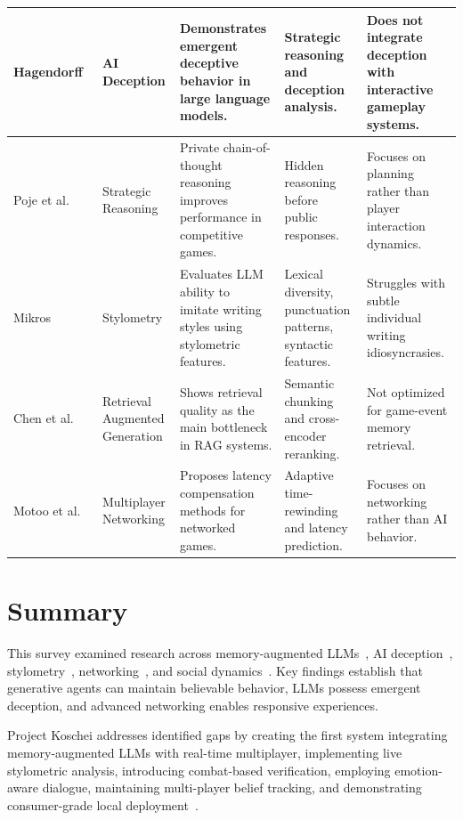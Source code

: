 {\begin{longtable}{|p{2.3cm}|p{2.3cm}|p{3.5cm}|p{3.3cm}|p{2.8cm}|}
Hagendorff~\cite{hagendorff2023} &
AI Deception &
Demonstrates emergent deceptive behavior in large language models. &
Strategic reasoning and deception analysis. &
Does not integrate deception with interactive gameplay systems. \\ \hline

Poje et al.~\cite{poje2023} &
Strategic Reasoning &
Private chain-of-thought reasoning improves performance in competitive games. &
Hidden reasoning before public responses. &
Focuses on planning rather than player interaction dynamics. \\ \hline

Mikros~\cite{mikros2023} &
Stylometry &
Evaluates LLM ability to imitate writing styles using stylometric features. &
Lexical diversity, punctuation patterns, syntactic features. &
Struggles with subtle individual writing idiosyncrasies. \\ \hline

Chen et al.~\cite{chen2023} &
Retrieval Augmented Generation &
Shows retrieval quality as the main bottleneck in RAG systems. &
Semantic chunking and cross-encoder reranking. &
Not optimized for game-event memory retrieval. \\ \hline

Motoo et al.~\cite{motoo2021} &
Multiplayer Networking &
Proposes latency compensation methods for networked games. &
Adaptive time-rewinding and latency prediction. &
Focuses on networking rather than AI behavior. \\ \hline

\end{longtable}
}

\section{Summary}

This survey examined research across memory-augmented LLMs~\cite{park2023generative,liu2022,wangw2024}, AI deception~\cite{hagendorff2023,poje2023}, stylometry~\cite{mikros2023,kolenbrander2023}, networking~\cite{motoo2021,barri2016}, and social dynamics~\cite{raith2021}. Key findings establish that generative agents can maintain believable behavior, LLMs possess emergent deception, and advanced networking enables responsive experiences.

Project Koschei addresses identified gaps by creating the first system integrating memory-augmented LLMs with real-time multiplayer, implementing live stylometric analysis, introducing combat-based verification, employing emotion-aware dialogue, maintaining multi-player belief tracking, and demonstrating consumer-grade local deployment~\cite{zeng2023,danry2023,chandrasekhara2024}.
